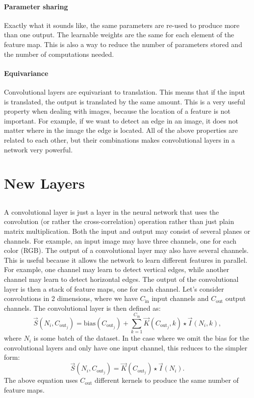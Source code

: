         \paragraph{Parameter sharing}
            Exactly what it sounds like, the same parameters are re-used to produce more than one output. The learnable weights are the same for each element of the feature map. This is also a way to reduce the number of parameters stored and the number of computations needed.

        \paragraph{Equivariance}
            Convolutional layers are equivariant to translation. This means that if the input is translated, the output is translated by the same amount. This is a very useful property when dealing with images, because the location of a feature is not important. For example, if we want to detect an edge in an image, it does not matter where in the image the edge is located.
        All of the above properties are related to each other, but their combinations makes convolutional layers in a network very powerful.
\section{New Layers}
    \subsection{}
        A convolutional layer is just a layer in the neural network that uses the convolution (or rather the cross-correlation) operation rather than just plain matrix multiplication. Both the input and output may consist of several planes or channels. For example, an input image may have three channels, one for each color (RGB). The output of a convolutional layer may also have several channels. This is useful because it allows the network to learn different features in parallel. For example, one channel may learn to detect vertical edges, while another channel may learn to detect horizontal edges. The output of the convolutional layer is then a stack of feature maps, one for each channel. Let's consider convolutions in 2 dimensions, where we have $C_\mathrm{in}$ input channels and $C_\mathrm{out}$ output channels. The convolutional layer is then defined as:
        \begin{equation}
            \vec{S}(N_i, C_{\mathrm{out}_j}) = \mathrm{bias}(C_{\mathrm{out}_j}) + \sum_{k=1}^{C_\mathrm{in}} \vec{K}(C_{\mathrm{out}_j}, k) \star \vec{I}(N_i, k),
        \end{equation}
        where $N_i$ is some batch of the dataset. In the case where we omit the bias for the convolutional layers and only have one input channel, this reduces to the simpler form: 
        \begin{equation}
            \vec{S}(N_i, C_{\mathrm{out}_j}) = \vec{K}(C_{\mathrm{out}_j}) \star \vec{I}(N_i).
        \end{equation} 
        The above equation uses $C_{\mathrm{out}}$ different kernels to produce the same number of feature maps. 

